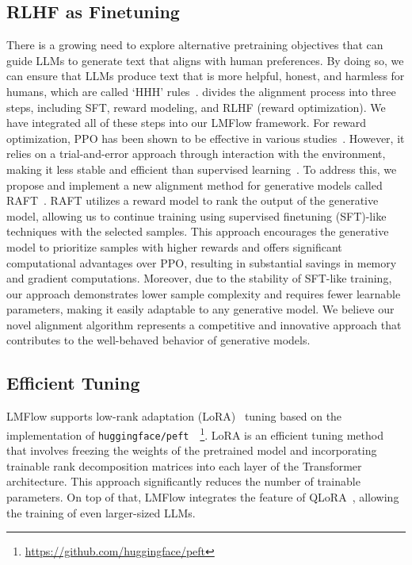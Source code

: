 \documentclass[11pt]{article}
\begin{document}
\subsection{RLHF as Finetuning}
There is a growing need to explore alternative pretraining objectives that can guide LLMs to generate text that aligns with human preferences.
By doing so, we can ensure that LLMs produce text that is more helpful, honest, and harmless for humans, which are called `HHH' rules~\citep{askell2021general}. \citet{ouyang2022training} divides the alignment process into three steps, including SFT, reward modeling, and RLHF (reward optimization). 
We have integrated all of these steps into our LMFlow framework. 
For reward optimization, PPO has been shown to be effective in various studies~\citep{schulman2017proximal, engstrom2020implementation}. 
However, it relies on a trial-and-error approach through interaction with the environment, making it less stable and efficient than supervised learning~\citep{choshen2019weaknesses}. 
To address this, we propose and implement a new alignment method for generative models called RAFT~\citep{dong2023raft}. 
RAFT utilizes a reward model to rank the output of the generative model, allowing us to continue training using supervised finetuning (SFT)-like techniques with the selected samples. 
This approach encourages the generative model to prioritize samples with higher rewards and offers significant computational advantages over PPO, resulting in substantial savings in memory and gradient computations. 
Moreover, due to the stability of SFT-like training, our approach demonstrates lower sample complexity and requires fewer learnable parameters, making it easily adaptable to any generative model. 
We believe our novel alignment algorithm represents a competitive and innovative approach that contributes to the well-behaved behavior of generative models.


\subsection{Efficient Tuning}
LMFlow supports low-rank adaptation (LoRA)~\citep{hulora} tuning based on the implementation of \texttt{huggingface/peft}~\citep{peft}~\footnote{\url{https://github.com/huggingface/peft}}.
LoRA is an efficient tuning method that involves freezing the weights of the pretrained model and incorporating trainable rank decomposition matrices into each layer of the Transformer architecture.
This approach significantly reduces the number of trainable parameters. 
On top of that, LMFlow integrates the feature of QLoRA~\citep{dettmers2023qlora}, allowing the training of even larger-sized LLMs.
\end{document}
